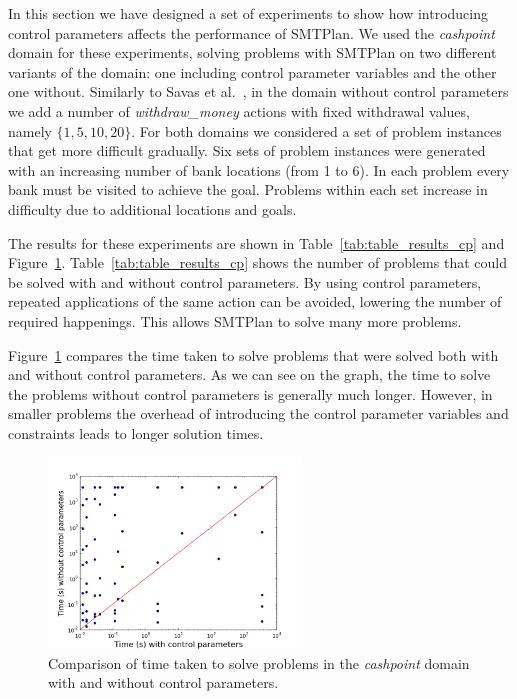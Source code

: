 In this section we have designed a set of experiments to show how introducing control parameters affects the performance of SMTPlan. We used the \textit{cashpoint} domain for these experiments, solving problems with SMTPlan on two different variants of the domain: one including control parameter variables and the other one without. Similarly to Savas et al.~\cite{savas2016planning}, in the domain without control parameters we add a number of \textit{withdraw\_money} actions with fixed withdrawal values, namely $\{1, 5, 10, 20\}$. For both domains we considered a set of problem instances that get more difficult gradually. Six sets of problem instances were generated with an increasing number of bank locations (from 1 to 6). In each problem every bank must be visited to achieve the goal. Problems within each set increase in difficulty due to additional locations and goals.

The results for these experiments are shown in Table~\ref{tab:table_results_cp} and Figure~\ref{fig:CP_results}. Table~\ref{tab:table_results_cp} shows the number of problems that could be solved with and without control parameters. By using control parameters, repeated applications of the same action can be avoided, lowering the number of required happenings. This allows SMTPlan to solve many more problems.

Figure~\ref{fig:CP_results} compares the time taken to solve problems that were solved both with and without control parameters. As we can see on the graph, the time to solve the problems without control parameters is generally much longer. However, in smaller problems the overhead of introducing the control parameter variables and constraints leads to longer solution times.

\begin{figure}[!ht]
\centering
\includegraphics[width=0.60\textwidth]{diagrams/CP_results.png}
\caption{Comparison of time taken to solve problems in the \textit{cashpoint} domain with and without control parameters.}
\label{fig:CP_results}
\end{figure}



